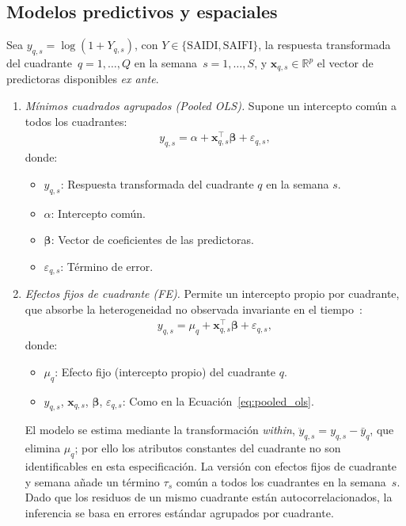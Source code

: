 \subsection{Modelos predictivos y espaciales}
\label{sec:modelos_formulacion}

Sea $y_{q,s}=\log\left(1+Y_{q,s}\right)$, con $Y\in\{\mathrm{SAIDI},\mathrm{SAIFI}\}$, la respuesta transformada del cuadrante~$q=1,\ldots,Q$ en la semana~$s=1,\ldots,S$, y $\mathbf{x}_{q,s}\in\mathbb{R}^{p}$ el vector de predictoras disponibles \emph{ex ante}.

\begin{enumerate}
    \item \textit{Mínimos cuadrados agrupados (Pooled OLS).} Supone un intercepto común a todos los cuadrantes:
    \begin{equation}
        \begin{aligned}
        y_{q,s} = \alpha + \mathbf{x}_{q,s}^{\top}\boldsymbol{\beta} + \varepsilon_{q,s},
        \end{aligned}
        \label{eq:pooled_ols}
    \end{equation}
    donde:
    \begin{itemize}
        \item $y_{q,s}$: Respuesta transformada del cuadrante $q$ en la semana $s$.
        \item $\alpha$: Intercepto común.
        \item $\boldsymbol{\beta}$: Vector de coeficientes de las predictoras.
        \item $\varepsilon_{q,s}$: Término de error.
    \end{itemize}

    \item \textit{Efectos fijos de cuadrante (FE).} Permite un intercepto propio por cuadrante, que absorbe la heterogeneidad no observada invariante en el tiempo~\cite{wooldridge2010}:
    \begin{equation}
        \begin{aligned}
        y_{q,s} = \mu_q + \mathbf{x}_{q,s}^{\top}\boldsymbol{\beta} + \varepsilon_{q,s},
        \end{aligned}
        \label{eq:efectos_fijos}
    \end{equation}
    donde:
    \begin{itemize}
        \item $\mu_q$: Efecto fijo (intercepto propio) del cuadrante $q$.
        \item $y_{q,s}$, $\mathbf{x}_{q,s}$, $\boldsymbol{\beta}$, $\varepsilon_{q,s}$: Como en la Ecuación~\eqref{eq:pooled_ols}.
    \end{itemize}
    El modelo se estima mediante la transformación \textit{within}, $\ddot{y}_{q,s}=y_{q,s}-\bar{y}_{q}$, que elimina $\mu_q$; por ello los atributos constantes del cuadrante no son identificables en esta especificación. La versión con efectos fijos de cuadrante y semana añade un término $\tau_s$ común a todos los cuadrantes en la semana~$s$. Dado que los residuos de un mismo cuadrante están autocorrelacionados, la inferencia se basa en errores estándar agrupados por cuadrante.


\end{enumerate}
